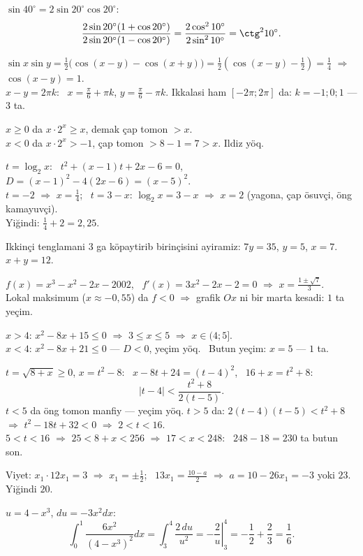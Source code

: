 $\sin40^\circ=2\sin20^\circ\cos20^\circ$:
\[\frac{2\sin20^\circ(1+\cos20^\circ)}{2\sin20^\circ(1-\cos20^\circ)}=\frac{2\cos^210^\circ}{2\sin^210^\circ}=\ctg^210^\circ.\]

$\sin x\sin y=\frac12\bigl(\cos(x-y)-\cos(x+y)\bigr)=\frac12\left(\cos(x-y)-\frac12\right)=\frac14$ $\Rightarrow$ $\cos(x-y)=1$.\\
$x-y=2\pi k$: \ $x=\frac\pi6+\pi k$, $y=\frac\pi6-\pi k$. Ikkalasi ham $[-2\pi;2\pi]$ da: $k=-1;0;1$ — $3$ ta.

$x\ge0$ da $x\cdot2^x\ge x$, demak çap tomon $>x$.\\
$x<0$ da $x\cdot2^x>-1$, çap tomon $>8-1=7>x$. Ildiz yöq.

$t=\log_2x$: \ $t^2+(x-1)t+2x-6=0$, \ $D=(x-1)^2-4(2x-6)=(x-5)^2$.\\
$t=-2$ $\Rightarrow$ $x=\frac14$; \ $t=3-x$: $\log_2x=3-x$ $\Rightarrow$ $x=2$ (yagona, çap ösuvçi, öng kamayuvçi).\\
Yiğindi: $\frac14+2=2{,}25$.

Ikkinçi tenglamani $3$ ga köpaytirib birinçisini ayiramiz: $7y=35$, $y=5$, $x=7$. \ $x+y=12$.

$f(x)=x^3-x^2-2x-2002$, \ $f'(x)=3x^2-2x-2=0$ $\Rightarrow$ $x=\frac{1\pm\sqrt7}3$.\\
Lokal maksimum ($x\approx-0{,}55$) da $f<0$ $\Rightarrow$ grafik $Ox$ ni bir marta kesadi: $1$ ta yeçim.

$x>4$: $x^2-8x+15\le0$ $\Rightarrow$ $3\le x\le5$ $\Rightarrow$ $x\in(4;5]$.\\
$x<4$: $x^2-8x+21\le0$ — $D<0$, yeçim yöq. \ Butun yeçim: $x=5$ — $1$ ta.

$t=\sqrt{8+x}\ge0$, $x=t^2-8$: \ $x-8t+24=(t-4)^2$, \ $16+x=t^2+8$:
\[|t-4|<\frac{t^2+8}{2(t-5)}.\]
$t<5$ da öng tomon manfiy — yeçim yöq. $t>5$ da: $2(t-4)(t-5)<t^2+8$ $\Rightarrow$ $t^2-18t+32<0$ $\Rightarrow$ $2<t<16$.\\
$5<t<16$ $\Rightarrow$ $25<8+x<256$ $\Rightarrow$ $17<x<248$: \ $248-18=230$ ta butun son.

Viyet: $x_1\cdot12x_1=3$ $\Rightarrow$ $x_1=\pm\frac12$; \ $13x_1=\frac{10-a}2$ $\Rightarrow$ $a=10-26x_1=-3$ yoki $23$. Yiğindi $20$.

$u=4-x^3$, $du=-3x^2dx$:
\[\int_0^1\frac{6x^2}{(4-x^3)^2}dx=\int_3^4\frac{2\,du}{u^2}=\left.-\frac2u\right|_3^4=-\frac12+\frac23=\frac16.\]

